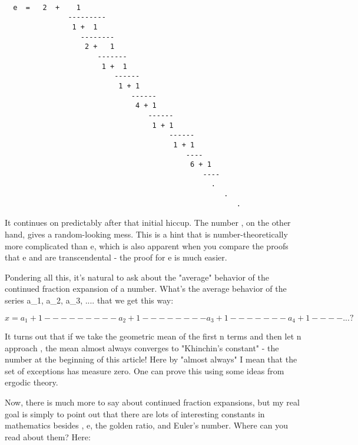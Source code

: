 \begin{verbatim}

  e  =   2  +    1
               ---------
                1 +  1
                  --------
                   2 +   1
                      -------
                       1 +  1
                          ------
                           1 + 1
                              ------
                               4 + 1
                                  ------
                                   1 + 1
                                       ------
                                        1 + 1
                                           ---- 
                                            6 + 1 
                                               ----
                                                 .
                                                    .
                                                       .
\end{verbatim}
    
It continues on predictably after that initial hiccup.  The number \pi ,
on the other hand, gives a random-looking mess.  This is a hint that
\pi  is number-theoretically more complicated than e, which is also
apparent when you compare the proofs that e and \pi  are transcendental
- the proof for e is much easier.

Pondering all this, it's natural to ask about the "average" behavior
of the continued fraction expansion of a number.   What's the average
behavior of the series a_{1}, 
a_{2}, a_{3}, .... that we get this way:


$$

       x =  a_{1} +   1
                ---------
                a_{2} +  1
                    -------- 
                    a_{3} +  1
                         -------
                          a_{4} +  1
                                ----
                                   .
                                     .
                                       .
                                         ?
$$
    
It turns out that if we take the geometric mean of the first n terms
and then let n approach \infty , the mean almost always converges to
"Khinchin's constant" - the number at the beginning of this article!
Here by "almost always" I mean that the set of exceptions has measure
zero.  One can prove this using some ideas from ergodic theory.



Now, there is much more to say about continued fraction expansions,
but my real goal is simply to point out that there are lots of
interesting constants in mathematics besides \pi , e, the golden
ratio, and Euler's number.  Where can you read about them?  Here:

